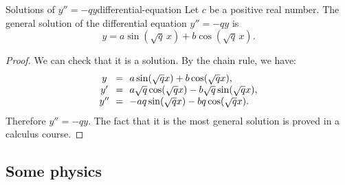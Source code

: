 \begin{theorem}{Solutions of $y''=-qy$}{differential-equation}
  Let $c$ be a positive real number.  The general solution of the
  differential equation $y'' = -qy$ is
  \begin{equation*}
    y = a\sin(\sqrt{q}\,x) + b\cos(\sqrt{q}\,x).
  \end{equation*}
\end{theorem}

\begin{proof}
  We can check that it is a solution. By the chain rule, we have:
  \begin{equation*}
    \begin{array}{c@{~~}c@{~~}l}
      y &=& a\sin(\sqrt{q}x) + b\cos(\sqrt{q}x), \\
      y' &=& a\sqrt{q}\cos(\sqrt{q}x) - b\sqrt{q}\sin(\sqrt{q}x), \\
      y'' &=& -aq\sin(\sqrt{q}x) - bq\cos(\sqrt{q}x). \\
    \end{array}
  \end{equation*}
  Therefore $y''=-qy$. The fact that it is the most general solution
  is proved in a calculus course.
\end{proof}

\subsection{Some physics}

